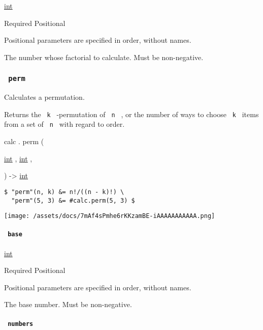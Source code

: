 \href{/docs/reference/foundations/int/}{int}

{Required} {{ Positional }}

\label{functions-fact-number-positional-tooltip}
Positional parameters are specified in order, without names.

The number whose factorial to calculate. Must be non-negative.

\subsubsection{\texorpdfstring{\texttt{\ perm\ }}{ perm }}\label{functions-perm}

Calculates a permutation.

Returns the \texttt{\ k\ } -permutation of \texttt{\ n\ } , or the
number of ways to choose \texttt{\ k\ } items from a set of
\texttt{\ n\ } with regard to order.

calc { . } { perm } (

{ \href{/docs/reference/foundations/int/}{int} , } {
\href{/docs/reference/foundations/int/}{int} , }

) -\textgreater{} \href{/docs/reference/foundations/int/}{int}

\begin{verbatim}
$ "perm"(n, k) &= n!/((n - k)!) \
  "perm"(5, 3) &= #calc.perm(5, 3) $
\end{verbatim}

\texttt{[image: /assets/docs/7mAf4sPmhe6rKKzamBE-iAAAAAAAAAAA.png]}

\paragraph{\texorpdfstring{\texttt{\ base\ }}{ base }}\label{functions-perm-base}

\href{/docs/reference/foundations/int/}{int}

{Required} {{ Positional }}

\label{functions-perm-base-positional-tooltip}
Positional parameters are specified in order, without names.

The base number. Must be non-negative.

\paragraph{\texorpdfstring{\texttt{\ numbers\ }}{ numbers }}\label{functions-perm-numbers}

